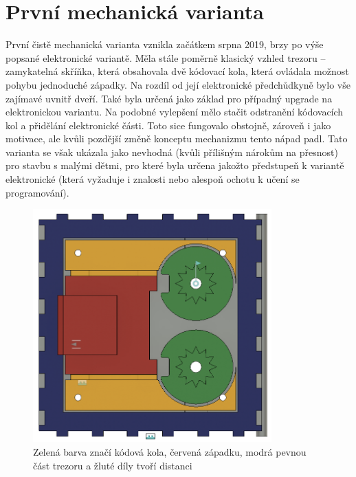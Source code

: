 \section{První mechanická varianta}

První čistě mechanická varianta vznikla začátkem srpna 2019, brzy po výše popsané elektronické variantě.
Měla stále poměrně klasický vzhled trezoru -- zamykatelná skříňka, která obsahovala dvě kódovací kola, která ovládala možnost pohybu jednoduché západky. %
Na rozdíl od její elektronické předchůdkyně bylo vše zajímavé uvnitř dveří. Také byla určená jako základ pro případný upgrade na elektronickou
variantu. Na podobné vylepšení mělo stačit odstranění kódovacích kol a přidělání elektronické části. Toto sice fungovalo obstojně, zároveň 
i jako motivace, ale kvůli pozdější změně konceptu mechanizmu tento nápad padl.
Tato varianta se však ukázala jako nevhodná (kvůli přílišným nárokům na přesnost) pro stavbu s malými dětmi, pro které byla určena jakožto předstupeň 
k variantě elektronické (která vyžaduje i znalosti nebo alespoň ochotu k učení se programování).

\begin{figure}[htbp]
    \centering
    \includegraphics[width=260pt]{kapitoly/obrazky/M1/mechanizmus.png}
    \caption{Zelená barva značí kódová kola, červená západku, modrá pevnou část trezoru a žluté díly tvoří distanci}
    \label{fig:M1-mechanizmus}
\end{figure}
\newpage